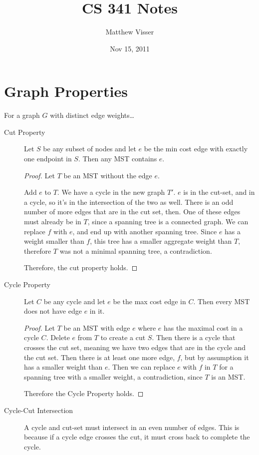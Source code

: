 \documentclass[12pt]{article}
\begin{document}
\title{CS 341 Notes}
\author{Matthew Visser}
\date{Nov 15, 2011}
\maketitle

\section{Graph Properties}

For a graph $G$ with distinct edge weights\dots

\begin{description}
	\item[Cut Property] Let $S$ be any subset of nodes and let $e$ be the min
		cost edge with exactly one endpoint in $S$. Then any MST contains $e$.
		\begin{proof}
			Let $T$ be an MST without the edge $e$.

			Add $e$ to $T$. We have a cycle in the new graph $T'$. $e$ is in the
			cut-set, and in a cycle, so it's in the intersection of the two as
			well. There is an odd number of more edges that are in the cut set,
			then. One of these edges must already be in $T$, since a spanning
			tree is a connected graph. We can replace $f$ with $e$, and end up
			with another spanning tree. Since $e$ has a weight smaller than $f$,
			this tree has a smaller aggregate weight than $T$, therefore $T$ was
			not a minimal spanning tree, a contradiction.

			Therefore, the cut property holds.
		\end{proof}
	\item[Cycle Property]  Let $C$ be any cycle and let $e$ be the max cost edge
		in $C$. Then every MST does not have edge $e$ in it.
		\begin{proof}
			Let $T$ be an MST with edge $e$ where $e$ has the maximal cost in a
			cycle $C$. Delete $e$ from $T$ to create a cut $S$. Then there is a
			cycle that crosses the cut set, meaning we have two edges that are
			in the cycle and the cut set. Then there is at least one more edge,
			$f$, but by assumption it has a smaller weight than $e$. Then we can
			replace $e$ with $f$ in $T$ for a spanning tree with a smaller
			weight, a contradiction, since $T$ is an MST.

			Therefore the Cycle Property holds.
		\end{proof}
	\item[Cycle-Cut Intersection] A cycle and cut-set must intersect in an even
		number of edges. This is because if a cycle edge crosses the cut, it
		must cross back to complete the cycle.
\end{description}
\end{document}
